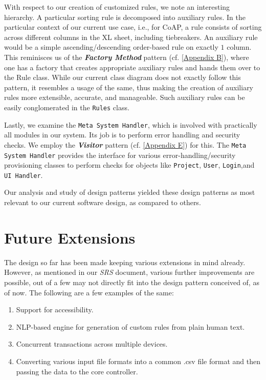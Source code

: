 \documentclass{report}
\begin{document}
With respect to our creation of customized rules, we note an interesting hierarchy. A particular sorting rule is decomposed into auxiliary rules. In the particular context of our current use case, i.e., for CoAP, a rule consists of sorting across different columns in the XL sheet, including tiebreakers. An auxiliary rule would be a simple ascending/descending order-based rule on exactly $1$ column. This reminisces us of the \textit{\textbf{Factory Method}} pattern (cf. \ref{Appendix B}), where one has a factory that creates appropriate auxiliary rules and hands them over to the Rule class. While our current class diagram does not exactly follow this pattern, it resembles a usage of the same, thus making the creation of auxiliary rules more extensible, accurate, and manageable. Such auxiliary rules can be easily conglomerated in the \texttt{Rules} class.

Lastly, we examine the \texttt{Meta System Handler}, which is involved with practically all modules in our system. Its job is to perform error handling and security checks. We employ the \textit{\textbf{Visitor}} pattern (cf. \ref{Appendix E}) for this. The \texttt{Meta System Handler} provides the interface for various error-handling/security provisioning classes to perform checks for objects like \texttt{Project}, \texttt{User}, \texttt{Login},and \texttt{UI Handler}. 

Our analysis and study of design patterns yielded these design patterns as most relevant to our current software design, as compared to others.

\chapter{Future Extensions}
\begin{tcolorbox}[colframe=white, colback=lightblue, arc=8pt]
  The design so far has been made keeping various extensions in mind already. However, as mentioned in our \textit{SRS} document, various further improvements are possible, out of a few may not directly fit into the design pattern conceived of, as of now. The following are a few examples of the same:
  \begin{enumerate}
      \item Support for accessibility.
      \item NLP-based engine for generation of custom rules from plain human text.
      \item Concurrent transactions across multiple devices.
      \item Converting various input file formats into a common .csv file format and then passing the data to the core controller.
  \end{enumerate}
\end{tcolorbox}
\end{document}
